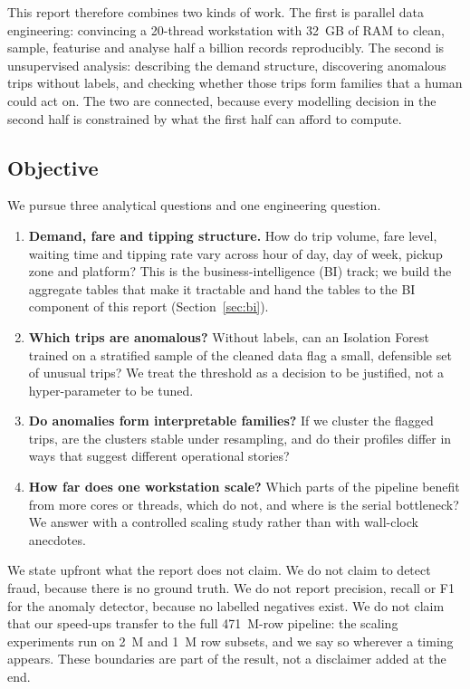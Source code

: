 \documentclass[11pt,a4paper]{article}
\begin{document}
This report therefore combines two kinds of work. The first is parallel data engineering: convincing a 20-thread workstation with 32~GB of RAM to clean, sample, featurise and analyse half a billion records reproducibly. The second is unsupervised analysis: describing the demand structure, discovering anomalous trips without labels, and checking whether those trips form families that a human could act on. The two are connected, because every modelling decision in the second half is constrained by what the first half can afford to compute.

\subsection{Objective}

We pursue three analytical questions and one engineering question.

\begin{enumerate}
\item[(a)] \textbf{Demand, fare and tipping structure.} How do trip volume, fare level, waiting time and tipping rate vary across hour of day, day of week, pickup zone and platform? This is the business-intelligence (BI) track; we build the aggregate tables that make it tractable and hand the tables to the BI component of this report (Section~\ref{sec:bi}).
\item[(b)] \textbf{Which trips are anomalous?} Without labels, can an Isolation Forest trained on a stratified sample of the cleaned data flag a small, defensible set of unusual trips? We treat the threshold as a decision to be justified, not a hyper-parameter to be tuned.
\item[(c)] \textbf{Do anomalies form interpretable families?} If we cluster the flagged trips, are the clusters stable under resampling, and do their profiles differ in ways that suggest different operational stories?
\item[(d)] \textbf{How far does one workstation scale?} Which parts of the pipeline benefit from more cores or threads, which do not, and where is the serial bottleneck? We answer with a controlled scaling study rather than with wall-clock anecdotes.
\end{enumerate}

We state upfront what the report does not claim. We do not claim to detect fraud, because there is no ground truth. We do not report precision, recall or F1 for the anomaly detector, because no labelled negatives exist. We do not claim that our speed-ups transfer to the full 471~M-row pipeline: the scaling experiments run on 2~M and 1~M row subsets, and we say so wherever a timing appears. These boundaries are part of the result, not a disclaimer added at the end.
\end{document}
